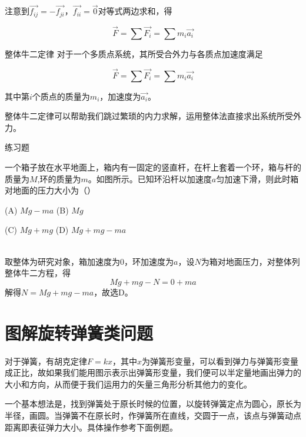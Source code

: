 注意到$\vec{f_{ij}} = - \vec{f_{ji}}$，$\vec{f_{ii}}=\vec{0}$对等式两边求和，得

$$\vec{F} = \sum \vec{F_i} = \sum m_i \vec{a_i}$$

\begin{theo}{整体牛二定律}{}
对于一个多质点系统，其所受合外力与各质点加速度满足

$$\vec{F} = \sum \vec{F_i} = \sum m_i \vec{a_i}$$

其中第$i$个质点的质量为$m_i$，加速度为$\vec{a_i}$。
\end{theo}

整体牛二定律可以帮助我们跳过繁琐的内力求解，运用整体法直接求出系统所受外力。

\begin{ep}{练习题}{}
\begin{minipage}[b]{0.6\linewidth}
一个箱子放在水平地面上，箱内有一固定的竖直杆，在杆上套着一个环，箱与杆的质量为$M$,环的质量为$m$。如图所示。已知环沿杆以加速度$a$匀加速下滑，则此时箱对地面的压力大小为（）

(A) $Mg-ma$ \quad (B) $Mg$

(C) $Mg+mg$ \quad (D) $Mg+mg-ma$
\end{minipage}
\hfill
\begin{minipage}[b]{0.3\linewidth}

\end{minipage}
~\\

取整体为研究对象，箱加速度为$0$，环加速度为$a$，设$N$为箱对地面压力，对整体列整体牛二方程，得
$$Mg+mg-N=0 + ma$$
解得$N=Mg+mg-ma$，故选D。
\end{ep}

\section{图解旋转弹簧类问题}

对于弹簧，有胡克定律$F=kx$，其中$x$为弹簧形变量，可以看到弹力与弹簧形变量成正比，故如果我们能用图示表示出弹簧形变量，我们便可以半定量地画出弹力的大小和方向，从而便于我们运用力的矢量三角形分析其他力的变化。

一个基本想法是，找到弹簧处于原长时候的位置，以旋转弹簧定点为圆心，原长为半径，画圆。当弹簧不在原长时，作弹簧所在直线，交圆于一点，该点与弹簧动点距离即表征弹力大小。具体操作参考下面例题。

